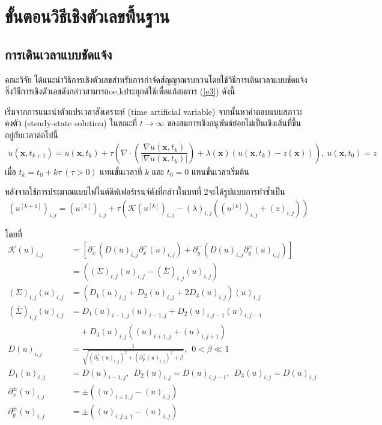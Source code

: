 \section{ขั้นตอนวิธีเชิงตัวเลขพื้นฐาน}

\subsection{การเดินเวลาแบบชัดแจ้ง}

\hspace{1cm} คณะวิจัย \cite{ref:ROF-template} ได้แนะนำวิธีการเชิงตัวเลขสำหรับการกำจัดสัญญาณรบกวนโดยใช้วิธีการเดินเวลาแบบชัดแจ้ง ซึ่งวิธีการเชิงตัวเลขดังกล่าวสามารถoe,kประยุกต์ใช้เพื่อแก้สมการ (\ref{e3})  ดังนี้
	
\hspace{1cm} เริ่มจากการแนะนําตัวแปรเวลาสังเคราะห์ (time artificial variable) จากนั้นหาคําตอบแบบสภาวะคงตัว (steady-state solution) ในขณะที่ $t\rightarrow \infty$ ของสมการเชิงอนุพันธ์ย่อยไม่เป็นเชิงเส้นที่ขึ้นอยู่กับเวลาต่อไปนี้ 
\begin{align}
	u(\mathbf{x},t_{k+1})=u(\mathbf{x},t_{k})+\tau\left(\nabla \cdot\left(\dfrac{\nabla u (\mathbf{x},t_k)}{| \nabla u (\mathbf{x},t_k) | }\right) + \lambda(\mathbf{x})(u (\mathbf{x},t_k)-z(\mathbf{x})) \right),\ u(\mathbf{x},t_0)=z
	\label{e4}
\end{align}
เมื่อ $t_k=t_0+k\tau\ (\tau>0)$  แทนขั้นเวลาที่ $k$ และ $t_0=0$ แทนขั้นเวลาเริ่มต้น

\hspace{1cm} หลังจากใช้การประมาณแบบไฟไนต์ดิฟเฟอร์เรนจ์ดังที่กล่าวในบทที่ 2จะได้รูปแบบการทำซ้ำเป็น 
\begin{align}
	(u^{[k+1]})_{i,j} = (u^{[k]})_{i,j}+\tau\left(\mathcal{K}(u^{[k]})_{i,j} - (\lambda)_{i,j} \left( (u^{[k]})_{i,j}+(z)_{i,j} \right) \right)
\end{align}

โดยที่
\begin{align*}
	\mathcal{K}(u)_{i,j}&=\left[{\partial_x^-} \left( {D(u)_{i,j}\partial_x^+(u)_{i,j}}\right)+ 
		{\partial_y^-} \left( {D(u)_{i,j}\partial_y^+(u)_{i,j}}\right)\right]\\
	&=\left( (\Sigma)_{i,j}(u)_{i,j}-(\bar\Sigma)_{i,j}(u)_{i,j}\right)\\
	(\Sigma)_{i,j}(u)_{i,j}&= \left( D_1(u)_{i,j}+D_2(u)_{i,j}+2D_3(u)_{i,j}\right)(u)_{i,j}\\
	(\bar\Sigma)_{i,j}(u)_{i,j}&= D_1(u)_{i-1,j}(u)_{i-1,j}+D_2(u)_{i,j-1}(u)_{i,j-1}\\
	&\quad+D_3(u)_{i,j}\left((u)_{i+1,j}+(u)_{i,j+1}\right) \\
	D(u)_{i,j} &= \tfrac{1}{\sqrt{(\partial_{x}^{+}(u)_{i,j})^2+(\partial_{y}^{+}(u)_{i,j})^2+\beta}},\ \ 0<\beta \ll 1\\
	D_1(u)_{i,j}&=D(u)_{i-1,j}, \ \
	D_2(u)_{i,j}=D(u)_{i,j-1}, \ \
	D_3(u)_{i,j}=D(u)_{i,j} \\
	\partial_{x}^{\pm}(u)_{i,j}&=\pm\left( (u)_{i \pm 1,j}-(u)_{i,j}\right)\\
	\partial_{y}^{\pm}(u)_{i,j}&=\pm\left( (u)_{i,j\pm 1}-(u)_{i,j}\right)
\end{align*}
	
